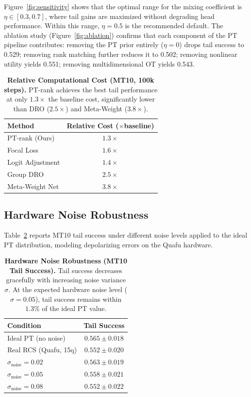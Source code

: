 \documentclass[10pt]{article}
\begin{document}
Figure~\ref{fig:sensitivity} shows that the optimal range for the mixing coefficient
is $\eta\in[0.3,0.7]$, where tail gains are maximized without degrading head performance.
Within this range, $\eta=0.5$ is the recommended default.  The ablation study
(Figure~\ref{fig:ablation}) confirms that each component of the PT pipeline contributes:
removing the PT prior entirely ($\eta=0$) drops tail success to 0.529; removing rank
matching further reduces it to 0.502; removing nonlinear utility yields 0.551; removing
multidimensional OT yields 0.543.

\begin{table}[tp]
  \centering
  \caption{{\bf Relative Computational Cost (MT10, 100k steps).}
    PT-rank achieves the best tail performance at only $1.3\times$ the baseline cost,
    significantly lower than DRO ($2.5\times$) and Meta-Weight ($3.8\times$).}
  \label{tab:cost}
  \begin{tabular}{@{}lc@{}}
    \toprule
    \textbf{Method} & \textbf{Relative Cost ($\times$baseline)} \\
    \midrule
    PT-rank (Ours)   & $\mathbf{1.3\times}$ \\
    Focal Loss       & $1.6\times$ \\
    Logit Adjustment & $1.4\times$ \\
    Group DRO        & $2.5\times$ \\
    Meta-Weight Net  & $3.8\times$ \\
    \bottomrule
  \end{tabular}
\end{table}

\subsection{Hardware Noise Robustness}
\label{sec:hardware}

Table~\ref{tab:hardware_robustness} reports MT10 tail success under different noise
levels applied to the ideal PT distribution, modeling depolarizing errors on the Quafu
hardware.

\begin{table}[tp]
  \centering
  \caption{{\bf Hardware Noise Robustness (MT10 Tail Success).}
    Tail success decreases gracefully with increasing noise variance $\sigma$.
    At the expected hardware noise level ($\sigma=0.05$), tail success remains
    within $1.3\%$ of the ideal PT value.}
  \label{tab:hardware_robustness}
  \begin{tabular}{@{}lc@{}}
    \toprule
    \textbf{Condition} & \textbf{Tail Success} \\
    \midrule
    Ideal PT (no noise)     & $0.565\pm0.018$ \\
    Real RCS (Quafu, 15q)   & $0.552\pm0.020$ \\
    $\sigma_{\text{noise}}=0.02$ & $0.563\pm0.019$ \\
    $\sigma_{\text{noise}}=0.05$ & $0.558\pm0.021$ \\
    $\sigma_{\text{noise}}=0.08$ & $0.552\pm0.022$ \\
    \bottomrule
  \end{tabular}
\end{table}
\end{document}
